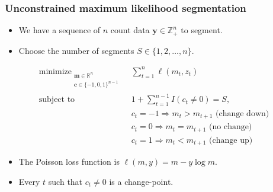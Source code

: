 \documentclass{beamer}
\DeclareMathOperator*{\minimize}{minimize}
\newcommand{\RR}{\mathbb R}
\newcommand{\ZZ}{\mathbb Z}
\begin{document}
\begin{frame}
  \frametitle{Unconstrained maximum likelihood segmentation}
  \begin{itemize}
  \item We have a sequence of $n$ count data $\mathbf y\in\ZZ_+^n$ to
    segment. 
  \item Choose the number of segments $S\in\{1, 2, \dots, n\}$.
  \end{itemize}
\begin{align*}
  \minimize_{\substack{
  \mathbf m\in\RR^{n}
\\
  \mathbf c\in\{-1,0,1\}^{n-1}
  }} &\ \ 
    \sum_{t=1}^n \ell( m_t,  z_t) 
\\
    \text{subject to} &\ \  1+\sum_{t=1}^{n-1} I(c_t \neq 0) = S, 
\nonumber\\
& \ \ c_t = -1 \Rightarrow m_{t} > m_{t+1} \text{ (change down)}
\nonumber\\
& \ \ c_t = 0 \Rightarrow m_{t} = m_{t+1}  \text{ (no change)}
\nonumber\\
& \ \ c_t = 1 \Rightarrow m_{t} < m_{t+1} \text{ (change up)}
\nonumber
\end{align*}
\begin{itemize}
\item The Poisson loss function is  $\ell( m,  y)= m - y \log m$.
\item Every $t$ such that $c_t \neq 0$ is a
change-point.
\end{itemize}

\end{frame}

\end{document}
